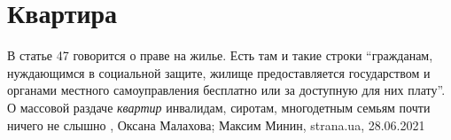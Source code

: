  
 
 
 
 
\chapter{Квартира}

В статье 47 говорится о праве на жилье. Есть там и такие строки \enquote{гражданам,
нуждающимся в социальной защите, жилище предоставляется государством и органами
местного самоуправления бесплатно или за доступную для них плату}.  О массовой
раздаче \emph{квартир} инвалидам, сиротам, многодетным семьям почти ничего не слышно
, 
Оксана Малахова; Максим Минин, strana.ua, 28.06.2021

